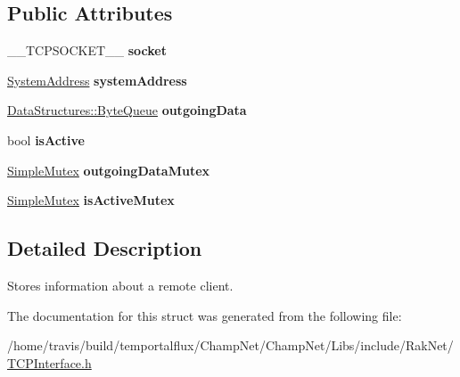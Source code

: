 \subsection*{Public Attributes}
\begin{DoxyCompactItemize}
\item 
\hypertarget{struct_rak_net_1_1_remote_client_a6a7a414c86ff3ef2332a1b564c01f22c}{\-\_\-\-\_\-\-T\-C\-P\-S\-O\-C\-K\-E\-T\-\_\-\-\_\- {\bfseries socket}}\label{struct_rak_net_1_1_remote_client_a6a7a414c86ff3ef2332a1b564c01f22c}

\item 
\hypertarget{struct_rak_net_1_1_remote_client_a2d9792f12ed3de38f88e41019385a480}{\hyperlink{struct_rak_net_1_1_system_address}{System\-Address} {\bfseries system\-Address}}\label{struct_rak_net_1_1_remote_client_a2d9792f12ed3de38f88e41019385a480}

\item 
\hypertarget{struct_rak_net_1_1_remote_client_ac88ed6c49a5686a557eede2d44a3e23e}{\hyperlink{class_data_structures_1_1_byte_queue}{Data\-Structures\-::\-Byte\-Queue} {\bfseries outgoing\-Data}}\label{struct_rak_net_1_1_remote_client_ac88ed6c49a5686a557eede2d44a3e23e}

\item 
\hypertarget{struct_rak_net_1_1_remote_client_a3cbecc23982107dd09079172e57e2322}{bool {\bfseries is\-Active}}\label{struct_rak_net_1_1_remote_client_a3cbecc23982107dd09079172e57e2322}

\item 
\hypertarget{struct_rak_net_1_1_remote_client_acc9a906886b1d392e5cbf3939b931a76}{\hyperlink{class_rak_net_1_1_simple_mutex}{Simple\-Mutex} {\bfseries outgoing\-Data\-Mutex}}\label{struct_rak_net_1_1_remote_client_acc9a906886b1d392e5cbf3939b931a76}

\item 
\hypertarget{struct_rak_net_1_1_remote_client_af456681f75ca5040e5bb1a86a5e9dd63}{\hyperlink{class_rak_net_1_1_simple_mutex}{Simple\-Mutex} {\bfseries is\-Active\-Mutex}}\label{struct_rak_net_1_1_remote_client_af456681f75ca5040e5bb1a86a5e9dd63}

\end{DoxyCompactItemize}


\subsection{Detailed Description}
Stores information about a remote client. 

The documentation for this struct was generated from the following file\-:\begin{DoxyCompactItemize}
\item 
/home/travis/build/temportalflux/\-Champ\-Net/\-Champ\-Net/\-Libs/include/\-Rak\-Net/\hyperlink{_t_c_p_interface_8h}{T\-C\-P\-Interface.\-h}\end{DoxyCompactItemize}
